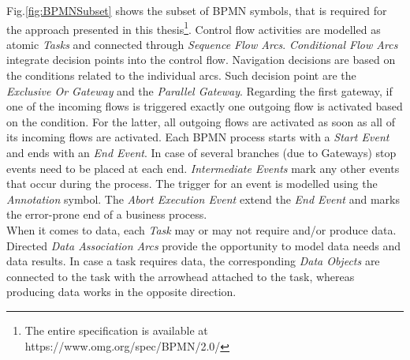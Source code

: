 \noindent
Fig.\ref{fig:BPMNSubset} shows the subset of BPMN symbols, that is required for the approach presented in this thesis\footnote{The entire specification is available at https://www.omg.org/spec/BPMN/2.0/}. Control flow activities are modelled as atomic \textit{Tasks} and connected through \textit{Sequence Flow Arcs}. \textit{Conditional Flow Arcs} integrate decision points into the control flow. Navigation decisions are based on the conditions related to the individual arcs. Such decision point are the \textit{Exclusive Or Gateway} and the \textit{Parallel Gateway}. Regarding the first gateway, if one of the incoming flows is triggered exactly one outgoing flow is activated based on the condition. For the latter, all outgoing flows are activated as soon as all of its incoming flows are activated. Each BPMN process starts with a \textit{Start Event} and ends with an \textit{End Event}. In case of several branches (due to Gateways) stop events need to be placed at each end. \textit{Intermediate Events} mark any other events that occur during the process. The trigger for an event is modelled using the \textit{Annotation} symbol. The \textit{Abort Execution Event} extend the \textit{End Event} and marks the error-prone end of a business process. \\
When it comes to data, each \textit{Task} may or may not require and/or produce data. Directed \textit{Data Association Arcs} provide the opportunity to model data needs and data results. In case a task requires data, the corresponding \textit{Data Objects} are connected to the task with the arrowhead attached to the task, whereas producing data works in the opposite direction. \\








